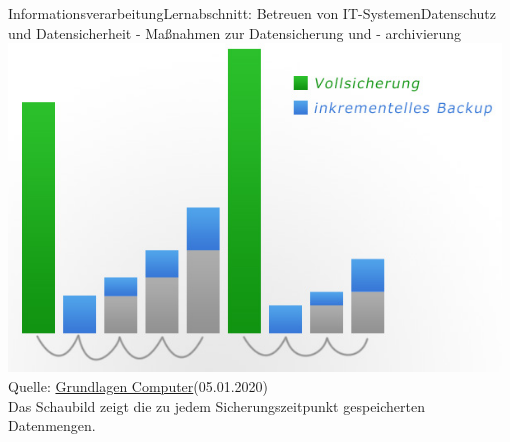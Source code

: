 \documentclass[11pt,oneside,openany,headings=optiontotoc,11pt,numbers=noenddot]{article}
\begin{document}
\begin{worksheet}{Informationsverarbeitung}{Lernabschnitt: Betreuen von IT-Systemen}{Datenschutz und Datensicherheit - Maßnahmen zur Datensicherung und - archivierung}
		\includegraphics[width=0.98\textwidth]{../99_Bilder/01_ink.jpg}\\
		\tiny{Quelle: \href{https://www.grundlagen-computer.de/backup/backup-strategien-inkrementell-differentiell-und-vollbackup}{Grundlagen Computer}(05.01.2020)}\\
		\footnotesize{Das Schaubild zeigt die zu jedem Sicherungszeitpunkt gespeicherten Datenmengen.}\normalsize
	\end{worksheet}
\end{document}
